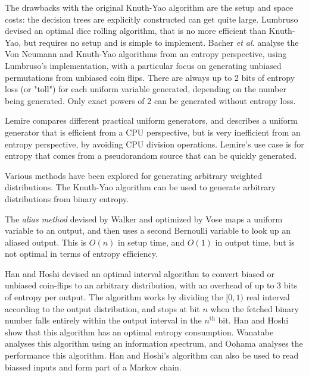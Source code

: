 \documentclass[lettersize,journal]{IEEEtran}
\begin{document}
The drawbacks with the original Knuth-Yao algorithm are the setup and space costs: the decision trees are explicitly constructed can get quite large. \cite{saad2020optimalsampling, saad2025} Lumbruso \cite{lumbroso2013optimal} devised an optimal dice rolling algorithm, that is no more efficient than Knuth-Yao, but requires no setup and is simple to implement. Bacher \emph{et al.} \cite{bacher2017} analyse the Von Neumann and Knuth-Yao algorithms from an entropy perspective, using Lumbruso's implementation, with a particular focus on generating unbiased permutations from unbiased coin flips. There are always up to 2 bits of entropy loss (or "toll") for each uniform variable generated, depending on the number being generated. Only exact powers of 2 can be generated without entropy loss. \cite{knuth1976complexity}

Lemire \cite{lemire2019fast} compares different practical uniform generators, and describes a uniform generator that is efficient from a CPU perspective, but is very inefficient from an entropy perspective, by avoiding CPU division operations. Lemire's use case is for entropy that comes from a pseudorandom source that can be quickly generated.

Various methods have been explored for generating arbitrary weighted distributions. The Knuth-Yao algorithm can be used to generate arbitrary distributions from binary entropy.

The \emph{alias method} devised by Walker \cite{walker1977efficient} and optimized by Vose \cite{vose91} maps a uniform variable to an output, and then uses a second Bernoulli variable to look up an aliased output. This is $O(n)$ in setup time, and $O(1)$ in output time, but is not optimal in terms of entropy efficiency.

Han and Hoshi \cite{han97} devised an optimal interval algorithm to convert biased or unbiased coin-flips to an arbitrary distribution, with an overhead of up to 3 bits of entropy per output.  The algorithm works by dividing the $[0,1)$ real interval according to the output distribution, and stops at bit $n$ when the fetched binary number falls entirely within the output interval in the $n^\text{th}$ bit. Han and Hoshi show that this algorithm has an optimal entropy consumption. 
Wanatabe \cite{wanatabe20} analyses this algorithm using an information spectrum, and Oohama \cite{oohama11, oohama2020performance} analyses the performance this algorithm. Han and Hoshi's algorithm can also be used to read biassed inputs and form part of a Markov chain.
\end{document}
